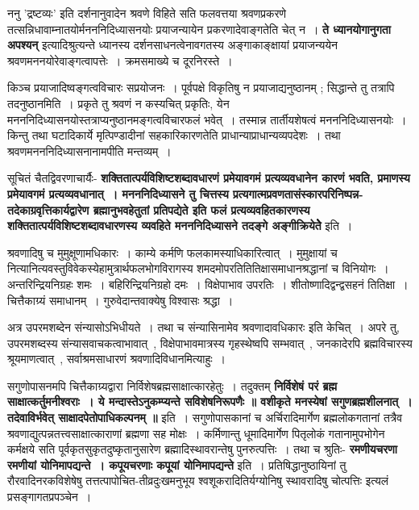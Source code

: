 	ननु 'द्रष्टव्यः' इति दर्शनानुवादेन श्रवणे विहिते सति फलवत्तया श्रवणप्रकरणे तत्सन्निधावाम्नातयोर्मनननिदिध्यासनयोः प्रयाजन्यायेन प्रकरणादेवाङ्गतेति चेत् न~। {\bfseries ते ध्यानयोगानुगता अपश्यन्} इत्यादिश्रुत्यन्ते ध्यानस्य दर्शनसाधनत्वेनावगतस्य अङ्गाकाङ्क्षायां प्रयाजन्ययेन श्रवणमननयोरेवाङ्गत्वापत्तेः~। क्रमसमाख्ये च दूरनिरस्ते~।\par
	किञ्च प्रयाजादिष्वङ्गत्वविचारः सप्रयोजनः~। पूर्वपक्षे विकृतिषु न प्रयाजाद्यनुष्ठानम् ; सिद्धान्ते तु तत्रापि तदनुष्ठानमिति~। प्रकृते तु श्रवणं न कस्यचित् प्रकृतिः, येन मनननिदिध्यासनयोस्तत्राप्यनुष्ठानमङ्गत्वविचारफलं भवेत्~। तस्मान्न तार्तीयशेषत्वं मनननिदिध्यासनयोः~। किन्तु तथा घटादिकार्ये मृत्पिण्डादीनां सहकारिकारणतेति प्राधान्याप्राधान्यव्यपदेशः~। तथा श्रवणमनननिदिध्यासनानामपीति मन्तव्यम्~।\par
	सूचितं चैतद्विवरणाचार्यैः- {\bfseries शक्तितात्पर्यविशिष्टशब्दावधारणं प्रमेयावगमं प्रत्यव्यवधानेन कारणं भवति, प्रमाणस्य प्रमेयावगमं प्रत्यव्यवधानात्~। मनननिदिध्यासने तु चित्तस्य प्रत्यगात्मप्रवणतासंस्कारपरिनिष्पन्न-तदेकाग्रवृत्तिकार्यद्वारेण ब्रह्मानुभवहेतुतां प्रतिपद्येते इति फलं प्रत्यव्यवहितकारणस्य शक्तितात्पर्यविशिष्टशब्दावधारणस्य व्यवहिते मनननिदिध्यासने तदङ्गे अङ्गीक्रियेतेेेे} इति~।\par
	श्रवणादिषु च मुमुक्षूणामधिकारः~। काम्ये कर्मणि फलकामस्याधिकारित्वात्~। मुमुक्षायां च नित्यानित्यवस्तुविवेकस्येहामुत्रार्थफलभोगविरागस्य शमदमोपरतितितिक्षासमाधानश्रद्धानां च विनियोगः~। अन्तरिन्द्रियनिग्रहः शमः~। बहिरिन्द्रियनिग्रहो दमः~। विक्षेपाभाव उपरतिः~। शीतोष्णादिद्वन्द्वसहनं तितिक्षा~। चित्तैकाग्र्यं समाधानम्~। गुरुवेदान्तवाक्येषु विश्वासः श्रद्धा~।\par
	अत्र उपरमशब्देन संन्यासोऽभिधीयते~। तथा च संन्यासिनामेव श्रवणादावधिकारः इति केचित्~। अपरे तु, उपरमशब्दस्य संन्यासवाचकत्वाभावात्~, विक्षेपाभावमात्रस्य गृहस्थेष्वपि सम्भवात्~, जनकादेरपि ब्रह्मविचारस्य श्रूयमाणत्वात्~, सर्वाश्रमसाधारणं श्रवणादिविधानमित्याहुः~।\par
	सगुणोपासनमपि चित्तैकाग्र्यद्वारा निर्विशेषब्रह्मसाक्षात्कारहेतुः~। तदुक्तम् {\bfseries निर्विशेषं परं ब्रह्म साक्षात्कर्तुमनीश्वराः~। ये मन्दास्तेऽनुकम्प्यन्ते सविशेषनिरूपणैः ॥ वशीकृते मनस्येषां सगुणब्रह्मशीलनात्~। तदेवाविर्भवेत् साक्षादपेतोपाधिकल्पनम् ॥} इति~। सगुणोपासकानां च अर्चिरादिमार्गेण ब्रह्मलोकगतानां तत्रैव श्रवणाद्युत्पन्नतत्त्वसाक्षात्काराणां ब्रह्मणा सह मोक्षः~। कर्मिणान्तु धूमादिमार्गेण पितृलोकं गतानामुपभोगेन कर्मक्षये सति पूर्वकृतसुकृतदुष्कृतानुसारेण ब्रह्मादिस्थावरान्तेषु पुनरुत्पत्तिः~। तथा च श्रुतिः- {\bfseries रमणीयचरणा रमणीयां योनिमापद्यन्ते~। कपूयचरणाः कपूयां योनिमापद्यन्ते} इति~। प्रतिषिद्धानुष्ठायिनां तु रौरवादिनरकविशेषेषु तत्तत्पापोचित-तीव्रदुःखमनुभूय श्वशूकरादितिर्यग्योनिषु स्थावरादिषु चोत्पत्तिः इत्यलं प्रसङ्गागतप्रपञ्चेन~।\par
